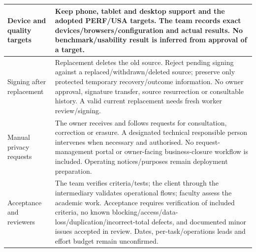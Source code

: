 {\begin{longtable}{L{0.24}L{0.76}}
\midrule
{}\label{decision:Q-NFR-07}Device and quality targets & Keep phone, tablet and desktop support and the adopted PERF/USA targets. The team records exact devices/browsers/configuration and actual results. No benchmark/usability result is inferred from approval of a target. \\
\midrule
{}\label{decision:Q-DOC-04}Signing after replacement & Replacement deletes the old source. Reject pending signing against a replaced/withdrawn/deleted source; preserve only protected temporary recovery/outcome information. No owner approval, signature transfer, source resurrection or consultable history. A valid current replacement needs fresh worker review/signing. \\
\midrule
{}\label{decision:Q-AA-07}\label{decision:D-36}Manual privacy requests & The owner receives and follows requests for consultation, correction or erasure. A designated technical responsible person intervenes when necessary and authorised. No request-management portal or owner-facing business-closure workflow is included. Operating notices/purposes remain deployment preparation. \\
\midrule
{}\label{decision:D-37}Acceptance and reviewers & The team verifies criteria/tests; the client through the intermediary validates operational flows; faculty assess the academic work. Acceptance requires verification of included criteria, no known blocking/access/data-loss/duplication/incorrect-total defects, and documented minor issues accepted in review. Dates, per-task/operations leads and effort budget remain unconfirmed. \\
\end{longtable}}

